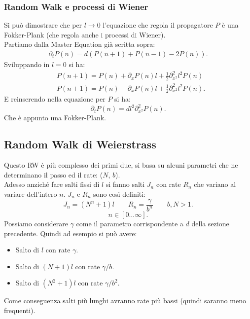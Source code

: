 \subsubsection{Random Walk e processi di Wiener}%
\label{subsub:Random Walk e processi di Wiener}
Si può dimostrare che per $l\to 0$ l'equazione che regola il propagatore $P$ è una Fokker-Plank (che regola anche i processi di Wiener). \\
Partiamo dalla Master Equation già scritta sopra:
\[\begin{aligned}
    \partial_{t}P(n) = d\left(P(n+1) + P(n-1) -2 P(n) \right)
.\end{aligned}\]
Sviluppando in $l=0$ si ha:
\[\begin{aligned}
    &P(n+1) = P(n) + \partial_{x}P(n) l + \frac{1}{2}\partial^2_{x^2} l^2P(n) \\
    &P(n+1) = P(n) - \partial_{x}P(n) l + \frac{1}{2}\partial^2_{x^2} l^2P(n)
.\end{aligned}\]
E reinserendo nella equazione per $P$ si ha:
\[
    \partial_{t}P(n) = dl^2 \partial^2_{x^2} P(n) 
.\] 
Che è appunto una Fokker-Plank.

\subsection{Random Walk di Weierstrass}%
\label{sub:Random Walk di Weierstrass}
Questo RW è più complesso dei primi due, si basa su alcuni parametri che ne determinano il passo ed il rate: ($N$, $b$).\\
Adesso anziché fare salti fissi di $l$ si fanno salti $J_n$ con rate $R_n$ che variano al variare dell'intero $n$. $J_n$ e $R_n$ sono così definiti:
\[
    J_n = \left(N^{n}+1\right)l \qquad R_n = \frac{\gamma}{b^n} \qquad b,N > 1
.\] 
\[
    n \in \left[0\ldots\infty\right]
.\] 
%
Possiamo considerare $\gamma$ come il parametro corrispondente a $d$ della sezione precedente.
Quindi ad esempio si può avere:
\begin{itemize}
    \item Salto di $l$ con rate $\gamma$. 
    \item Salto di $\left(N+1\right)l$ con rate $\gamma  / b$.
    \item Salto di $\left(N^2+1\right)l$ con rate $\gamma /b^2$.
\end{itemize}
Come conseguenza salti più lunghi avranno rate più bassi (quindi saranno meno frequenti).\\
